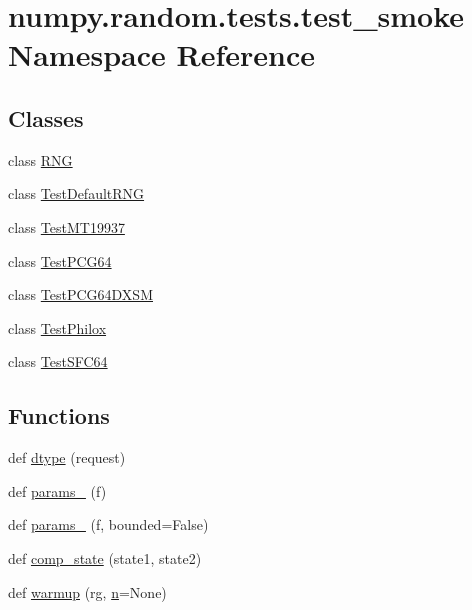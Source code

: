 \hypertarget{namespacenumpy_1_1random_1_1tests_1_1test__smoke}{}\section{numpy.\+random.\+tests.\+test\+\_\+smoke Namespace Reference}
\label{namespacenumpy_1_1random_1_1tests_1_1test__smoke}
\subsection*{Classes}
\begin{DoxyCompactItemize}
\item 
class \hyperlink{classnumpy_1_1random_1_1tests_1_1test__smoke_1_1RNG}{R\+NG}
\item 
class \hyperlink{classnumpy_1_1random_1_1tests_1_1test__smoke_1_1TestDefaultRNG}{Test\+Default\+R\+NG}
\item 
class \hyperlink{classnumpy_1_1random_1_1tests_1_1test__smoke_1_1TestMT19937}{Test\+M\+T19937}
\item 
class \hyperlink{classnumpy_1_1random_1_1tests_1_1test__smoke_1_1TestPCG64}{Test\+P\+C\+G64}
\item 
class \hyperlink{classnumpy_1_1random_1_1tests_1_1test__smoke_1_1TestPCG64DXSM}{Test\+P\+C\+G64\+D\+X\+SM}
\item 
class \hyperlink{classnumpy_1_1random_1_1tests_1_1test__smoke_1_1TestPhilox}{Test\+Philox}
\item 
class \hyperlink{classnumpy_1_1random_1_1tests_1_1test__smoke_1_1TestSFC64}{Test\+S\+F\+C64}
\end{DoxyCompactItemize}
\subsection*{Functions}
\begin{DoxyCompactItemize}
\item 
def \hyperlink{namespacenumpy_1_1random_1_1tests_1_1test__smoke_a9f08a7184be9d03413a436ef931b87c5}{dtype} (request)
\item 
def \hyperlink{namespacenumpy_1_1random_1_1tests_1_1test__smoke_a4588e0b7142a40ce3b37d5d729a6341b}{params\+\_} (f)
\item 
def \hyperlink{namespacenumpy_1_1random_1_1tests_1_1test__smoke_a69cde9b378ed271ec394d936e5852938}{params\+\_} (f, bounded=False)
\item 
def \hyperlink{namespacenumpy_1_1random_1_1tests_1_1test__smoke_a2f40499e200d3753ec7c9dc85eabded9}{comp\+\_\+state} (state1, state2)
\item 
def \hyperlink{namespacenumpy_1_1random_1_1tests_1_1test__smoke_a28b18053e84538c80ab796a4b54b4133}{warmup} (rg, \hyperlink{namespacenumpy_a352663c52853d2754274407d5cae2832}{n}=None)
\end{DoxyCompactItemize}

